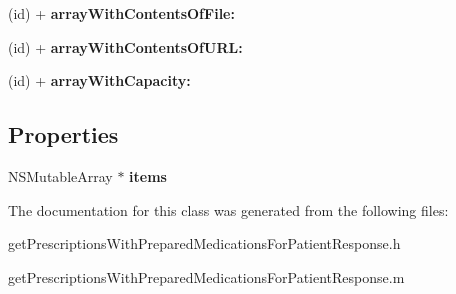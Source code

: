 \begin{DoxyCompactItemize}
\item 
\hypertarget{interfaceget_prescriptions_with_prepared_medications_for_patient_response_ab2e224914c40cc9a96641214771d94e4}{}(id) + {\bfseries array\+With\+Contents\+Of\+File\+:}\label{interfaceget_prescriptions_with_prepared_medications_for_patient_response_ab2e224914c40cc9a96641214771d94e4}

\item 
\hypertarget{interfaceget_prescriptions_with_prepared_medications_for_patient_response_a04cabb00a383a907826e311416f3ae2a}{}(id) + {\bfseries array\+With\+Contents\+Of\+U\+R\+L\+:}\label{interfaceget_prescriptions_with_prepared_medications_for_patient_response_a04cabb00a383a907826e311416f3ae2a}

\item 
\hypertarget{interfaceget_prescriptions_with_prepared_medications_for_patient_response_a3bd4aa8ab82882757175b7e3b3953925}{}(id) + {\bfseries array\+With\+Capacity\+:}\label{interfaceget_prescriptions_with_prepared_medications_for_patient_response_a3bd4aa8ab82882757175b7e3b3953925}

\end{DoxyCompactItemize}
\subsection*{Properties}
\begin{DoxyCompactItemize}
\item 
\hypertarget{interfaceget_prescriptions_with_prepared_medications_for_patient_response_acdcb15b077ea5a2707ac3edbd0300d97}{}N\+S\+Mutable\+Array $\ast$ {\bfseries items}\label{interfaceget_prescriptions_with_prepared_medications_for_patient_response_acdcb15b077ea5a2707ac3edbd0300d97}

\end{DoxyCompactItemize}


The documentation for this class was generated from the following files\+:\begin{DoxyCompactItemize}
\item 
get\+Prescriptions\+With\+Prepared\+Medications\+For\+Patient\+Response.\+h\item 
get\+Prescriptions\+With\+Prepared\+Medications\+For\+Patient\+Response.\+m\end{DoxyCompactItemize}
